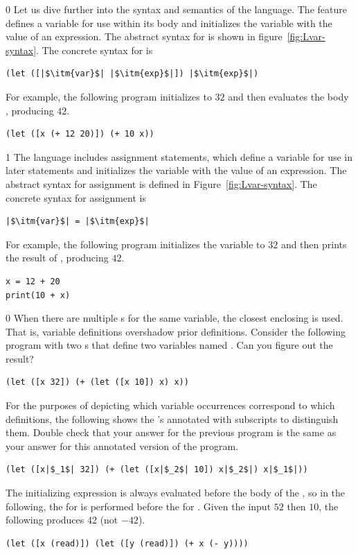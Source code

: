 \documentclass[7x10]{TimesAPriori_MIT}%
\def\racketEd{0}
\def\pythonEd{1}
\def\edition{0}
\numberwithin{theorem}{chapter}
\numberwithin{definition}{chapter}
\numberwithin{equation}{chapter}
\begin{document}
{\if\edition\racketEd
Let us dive further into the syntax and semantics of the \LangVar{}
language.  The  feature defines a variable for use within its
body and initializes the variable with the value of an expression.
The abstract syntax for  is shown in
figure~\ref{fig:Lvar-syntax}.  The concrete syntax for  is
\begin{lstlisting}
(let ([|$\itm{var}$| |$\itm{exp}$|]) |$\itm{exp}$|)
\end{lstlisting}
For example, the following program initializes  to $32$ and then
evaluates the body , producing $42$.
\begin{lstlisting}
(let ([x (+ 12 20)]) (+ 10 x))
\end{lstlisting}
\fi}
%
{\if\edition\pythonEd
%
The \LangVar{} language includes assignment statements, which define a
variable for use in later statements and initializes the variable with
the value of an expression.  The abstract syntax for assignment is
defined in Figure~\ref{fig:Lvar-syntax}.  The concrete syntax for
assignment is 
\begin{lstlisting}
|$\itm{var}$| = |$\itm{exp}$|
\end{lstlisting}
For example, the following program initializes the variable 
to $32$ and then prints the result of , producing $42$.
\begin{lstlisting}
x = 12 + 20
print(10 + x)
\end{lstlisting}
\fi}

{\if\edition\racketEd
%  
When there are multiple s for the same variable, the closest
enclosing  is used. That is, variable definitions overshadow
prior definitions. Consider the following program with two s
that define two variables named . Can you figure out the
result?
\begin{lstlisting}
(let ([x 32]) (+ (let ([x 10]) x) x))
\end{lstlisting}
For the purposes of depicting which variable occurrences correspond to
which definitions, the following shows the 's annotated with
subscripts to distinguish them. Double check that your answer for the
previous program is the same as your answer for this annotated version
of the program.
\begin{lstlisting}
(let ([x|$_1$| 32]) (+ (let ([x|$_2$| 10]) x|$_2$|) x|$_1$|))
\end{lstlisting}
The initializing expression is always evaluated before the body of the
, so in the following, the  for  is
performed before the  for . Given the input
$52$ then $10$, the following produces $42$ (not $-42$).
\begin{lstlisting}
(let ([x (read)]) (let ([y (read)]) (+ x (- y))))
\end{lstlisting}
\fi}
\end{document}
